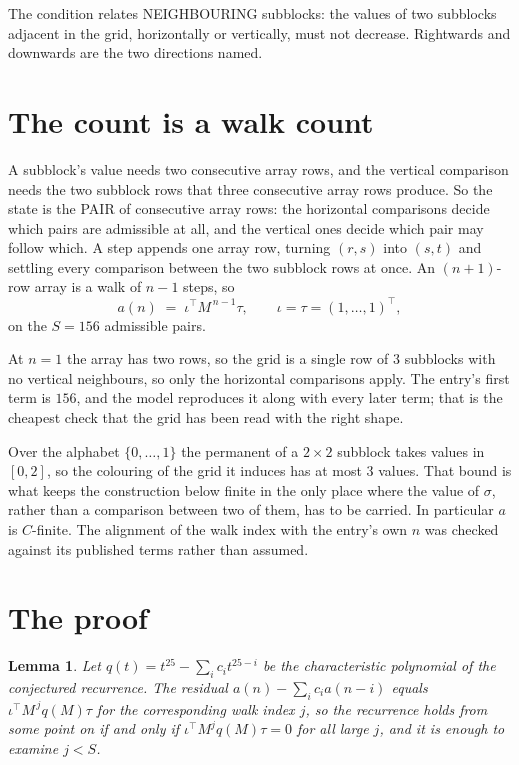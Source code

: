 \documentclass[11pt,a4paper]{article}
\theoremstyle{plain}
\newtheorem{lemma}[theorem]{Lemma}
\theoremstyle{definition}
\begin{document}
The condition relates NEIGHBOURING subblocks: the values of two subblocks adjacent in the grid,
horizontally or vertically, must not decrease. Rightwards and downwards are the two directions named.

\section{The count is a walk count}

A subblock's value needs two consecutive array rows, and the vertical
comparison needs the two subblock rows that three consecutive array rows produce. So the state
is the PAIR of consecutive array rows: the horizontal comparisons decide which pairs are
admissible at all, and the vertical ones decide which pair may follow which. A step appends one
array row, turning $(r,s)$ into $(s,t)$ and settling every comparison between the two subblock
rows at once. An $(n+1)$-row array is a walk of $n-1$ steps, so
\[
a(n)\;=\;\iota^{\!\top}M^{\,n-1}\tau,\qquad\iota=\tau=(1,\dots,1)^{\!\top},
\]
on the $S=156$ admissible pairs.

At $n=1$ the array has two rows, so the grid is a single row of $3$
subblocks with no vertical neighbours, so only the horizontal comparisons apply. The
entry's first term is $156$, and the model reproduces it along with every later term; that
is the cheapest check that the grid has been read with the right shape.

Over the alphabet $\{0,\dots,1\}$ the permanent of a $2\times2$ subblock takes values in
$[0,2]$, so the colouring of the grid it induces has at most $3$ values.
That bound is what keeps the construction below finite in the only place where the value of
$\sigma$, rather than a comparison between two of them, has to be carried.
In particular $a$ is $C$-finite. The alignment of the walk index with the entry's own $n$ was
checked against its published terms rather than assumed.

\section{The proof}

\begin{lemma}\label{lem:crit}
Let $q(t)=t^{25}-\sum_i c_it^{25-i}$ be the characteristic polynomial of the
conjectured recurrence. The residual $a(n)-\sum_ic_ia(n-i)$ equals
$\iota^{\!\top}M^{\,j}q(M)\tau$ for the corresponding walk index $j$, so the recurrence
holds from some point on if and only if $\iota^{\!\top}M^{j}q(M)\tau=0$ for all large $j$,
and it is enough to examine $j<S$.
\end{lemma}
\end{document}
